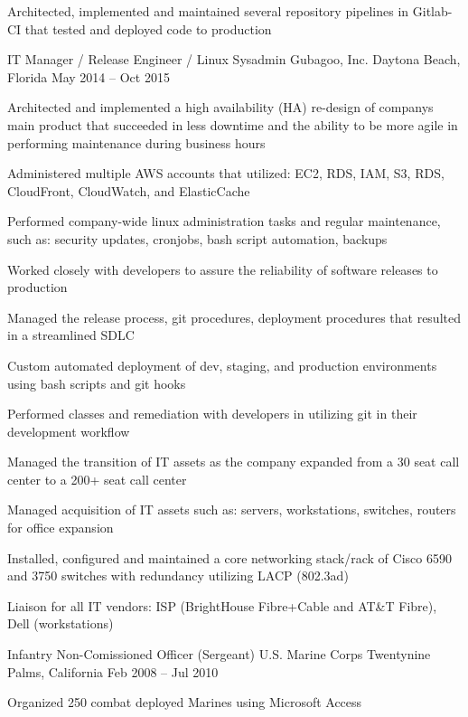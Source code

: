 \documentclass[]{awesome-cv}
\begin{document}
\begin{cventries}
{\begin{cvitems}
		\item {Architected, implemented and maintained several repository pipelines in Gitlab-CI that tested and deployed code to production}
		\end{cvitems}}
	\cventry
	{IT Manager / Release Engineer / Linux Sysadmin}
	{Gubagoo, Inc.}
	{Daytona Beach, Florida}
	{May 2014 – Oct 2015}
	{\begin{cvitems}
		\item {Architected and implemented a high availability (HA) re-design of company\textquotesingle{}s main product that succeeded in less downtime and the ability to be more agile in performing maintenance during business hours}
		\item {Administered multiple AWS accounts that utilized: EC2, RDS, IAM, S3, RDS, CloudFront, CloudWatch, and ElasticCache}
		\item {Performed company-wide linux administration tasks and regular maintenance, such as: security updates, cronjobs, bash script automation, backups}
		\item {Worked closely with developers to assure the reliability of software releases to production}
		\item {Managed the release process, git procedures, deployment procedures that resulted in a streamlined SDLC}
		\item {Custom automated deployment of dev, staging, and production environments using bash scripts and git hooks}
		\item {Performed classes and remediation with developers in utilizing git in their development workflow}
		\item {Managed the transition of IT assets as the company expanded from a 30 seat call center to a 200+ seat call center}
		\item {Managed acquisition of IT assets such as: servers, workstations, switches, routers for office expansion}
		\item {Installed, configured and maintained a core networking stack/rack of Cisco 6590 and 3750 switches with redundancy utilizing LACP (802.3ad)}
		\item {Liaison for all IT vendors: ISP (BrightHouse Fibre+Cable and AT\&T Fibre), Dell (workstations)}
		\end{cvitems}}
	\cventry
	{Infantry Non-Comissioned Officer (Sergeant)}
	{U.S. Marine Corps}
	{Twentynine Palms, California}
	{Feb 2008 – Jul 2010}
	{\begin{cvitems}
		\item {Organized 250 combat deployed Marines using Microsoft Access}

\end{cvitems}}
\end{cventries}
\end{document}
